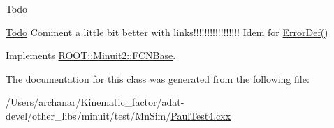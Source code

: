 \begin{DoxyRefDesc}{Todo}
\item[\mbox{\hyperlink{todo__todo000001}{Todo}}]Comment a little bit better with links!!!!!!!!!!!!!!!!! Idem for \mbox{\hyperlink{classROOT_1_1Minuit2_1_1FCNBase_ac4592475c58a65b037ba97ab5f3cba10}{Error\+Def()}}\end{DoxyRefDesc}


Implements \mbox{\hyperlink{classROOT_1_1Minuit2_1_1FCNBase_a04ef08ddad92ce8d89d498efbe021c39}{R\+O\+O\+T\+::\+Minuit2\+::\+F\+C\+N\+Base}}.



The documentation for this class was generated from the following file\+:\begin{DoxyCompactItemize}
\item 
/\+Users/archanar/\+Kinematic\+\_\+factor/adat-\/devel/other\+\_\+libs/minuit/test/\+Mn\+Sim/\mbox{\hyperlink{adat-devel_2other__libs_2minuit_2test_2MnSim_2PaulTest4_8cxx}{Paul\+Test4.\+cxx}}\end{DoxyCompactItemize}
